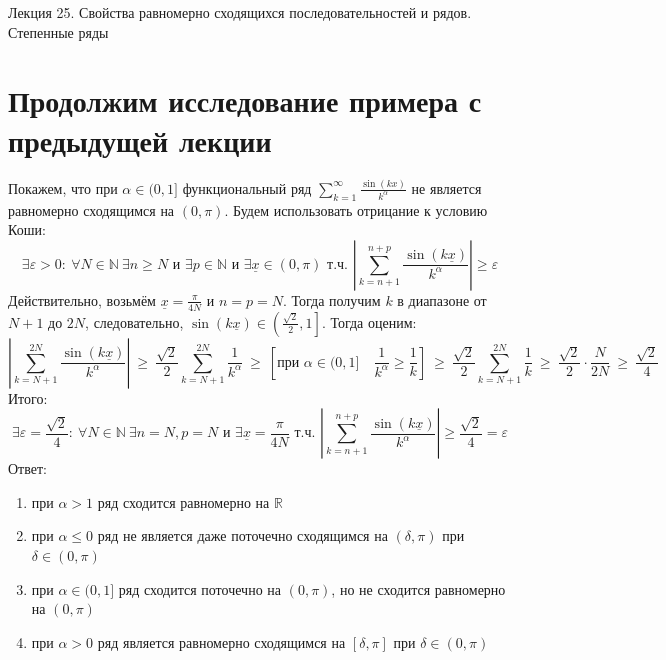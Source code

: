 \documentclass[11pt]{article}
\begin{document}
\begin{titlepage}
    \centering
    \vspace*{\fill}  %

    {\Huge Лекция 25. Свойства равномерно сходящихся последовательностей 
    и рядов. Степенные ряды}

    \vspace*{\fill}  %
\end{titlepage}

\setcounter{page}{1}

\section{Продолжим исследование примера с предыдущей лекции}

Покажем, что при $\alpha \in (0, 1]$ функциональный ряд $\displaystyle 
\sum_{k = 1}^{\infty} \frac{\sin(kx)}{k^{\alpha}}$ не является 
равномерно сходящимся на $(0, \pi)$. Будем использовать отрицание к 
условию Коши:
\[\exists \varepsilon > 0: \ \forall N \in \mathbb{N} \ \exists n \geq 
N \text{ и } \exists p \in \mathbb{N} \text{ и } \exists \underline{x} 
\in (0, \pi) \text{ т.ч. } \left\lvert \sum_{k = n + 1}^{n + p} 
\frac{\sin(k\underline{x})}{k^{\alpha}} \right\rvert \geq \varepsilon\]
Действительно, возьмём $\underline{x} = \displaystyle \frac{\pi}{4N}$ и 
$n = p = N$. Тогда получим $k$ в диапазоне от $N + 1$ до $2N$, 
следовательно, $\sin(k\underline{x}) \in \left(\displaystyle 
\frac{\sqrt{2}}{2}, 1\right]$. Тогда оценим:
\[\left\lvert \sum_{k = N + 1}^{2N} \frac{\sin(k\underline{x})}
{k^{\alpha}} \right\rvert \ \geq \ \frac{\sqrt{2}}{2} 
\sum_{k = N + 1}^{2N} \frac{1}{k^{\alpha}} \ \geq \ \left[\text{при } 
\alpha \in (0, 1] \quad \frac{1}{k^{\alpha}} \geq \frac{1}{k}\right] \ 
\geq \ \frac{\sqrt{2}}{2} \sum_{k = N + 1}^{2N} \frac{1}{k} \ \geq \ 
\frac{\sqrt{2}}{2} \cdot \frac{N}{2N} \ \geq \ \frac{\sqrt{2}}{4}\]
Итого:
\[\exists \varepsilon = \frac{\sqrt{2}}{4}: \ \forall N \in \mathbb{N} \ 
\exists n = N, p = N \text{ и } \exists \underline{x} = \frac{\pi}{4N}
\text{ т.ч. } \left\lvert \sum_{k = n + 1}^{n + p} 
\frac{\sin(k\underline{x})}{k^{\alpha}} \right\rvert \geq \frac{\sqrt{2}}
{4} = \varepsilon\]
Ответ: \begin{enumerate}
  \item при $\alpha > 1$ ряд сходится равномерно на $\mathbb{R}$
  \item при $\alpha \leq 0$ ряд не является даже поточечно сходящимся на 
  $(\delta, \pi)$ при $\delta \in (0, \pi)$
  \item при $\alpha \in (0, 1]$ ряд сходится поточечно на $(0, \pi)$, но 
  не сходится равномерно на $(0, \pi)$
  \item при $\alpha > 0$ ряд является равномерно сходящимся на $[\delta, 
  \pi]$ при $\delta \in (0, \pi)$
\end{enumerate}
\end{document}
